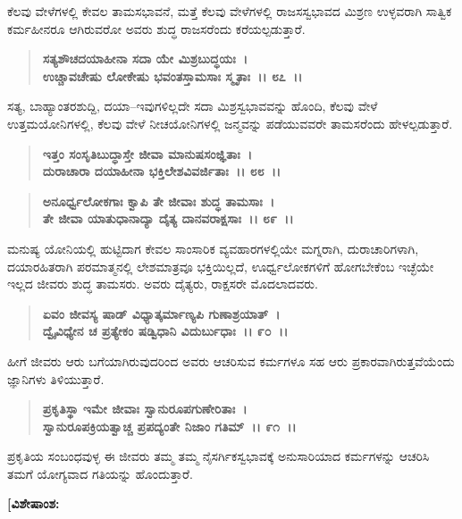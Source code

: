 ಕೆಲವು ವೇಳೆಗಳಲ್ಲಿ ಕೇವಲ ತಾಮಸಭಾವನೆ, ಮತ್ತೆ ಕೆಲವು ವೇಳೆಗಳಲ್ಲಿ ರಾಜಸಸ್ವಭಾವದ ಮಿಶ್ರಣ ಉಳ್ಳವರಾಗಿ ಸಾತ್ವಿಕ ಕರ್ಮಹೀನರೂ ಆಗಿರುವರೋ ಅವರು ಶುದ್ಧ ರಾಜಸರೆಂದು ಕರೆಯಲ್ಪಡುತ್ತಾರೆ.

\begin{verse}
\textbf{ಸತ್ಯಶೌಚದಯಾಹೀನಾ ಸದಾ ಯೇ ಮಿಶ್ರಬುದ್ಧಯಃ~।}\\\textbf{ಉಚ್ಚಾವಚೇಷು ಲೋಕೇಷು ಭವಂತಸ್ತಾಮಸಾಃ ಸ್ಮೃತಾಃ~।। ೮೭~।।}
\end{verse}

ಸತ್ಯ, ಬಾಹ್ಯಾಂತರಶುದ್ದಿ, ದಯಾ–ಇವುಗಳಿಲ್ಲದೇ ಸದಾ ಮಿಶ್ರಸ್ವಭಾವವನ್ನು ಹೊಂದಿ, ಕೆಲವು ವೇಳೆ ಉತ್ತಮಯೋನಿಗಳಲ್ಲಿ, ಕೆಲವು ವೇಳೆ ನೀಚಯೋನಿಗಳಲ್ಲಿ ಜನ್ಮವನ್ನು ಪಡೆಯುವವರೇ ತಾಮಸರೆಂದು ಹೇಳಲ್ಪಡುತ್ತಾರೆ.

\begin{verse}
\textbf{ಇತ್ತಂ ಸಂಸೃತಿಬುದ್ಧಾಸ್ತೇ ಜೀವಾ ಮಾನುಷಸಂಜ್ಞಿತಾಃ~।}\\\textbf{ದುರಾಚಾರಾ ದಯಾಹೀನಾ ಭಕ್ತಿಲೇಶವಿವರ್ಜಿತಾಃ~।। ೮೮~।।} 
\end{verse}

\begin{verse}
\textbf{ಅನೂರ್ಧ್ವಲೋಕಗಾಃ ಕ್ವಾಪಿ ತೇ ಜೀವಾಃ ಶುದ್ಧ ತಾಮಸಾಃ~।}\\\textbf{ತೇ ಜೀವಾ ಯಾತುಧಾನಾದ್ಯಾ ದೈತ್ಯ ದಾನವರಾಕ್ಷಸಾಃ~।। ೮೯~।।}
\end{verse}

ಮನುಷ್ಯ ಯೋನಿಯಲ್ಲಿ ಹುಟ್ಟಿದಾಗ ಕೇವಲ ಸಾಂಸಾರಿಕ ವ್ಯವಹಾರಗಳಲ್ಲಿಯೇ ಮಗ್ನರಾಗಿ, ದುರಾಚಾರಿಗಳಾಗಿ, ದಯಾರಹಿತರಾಗಿ ಪರಮಾತ್ಮನಲ್ಲಿ ಲೇಶಮಾತ್ರವೂ ಭಕ್ತಿಯಿಲ್ಲದೆ, ಊರ್ಧ್ವಲೋಕಗಳಿಗೆ ಹೋಗಬೇಕೆಂಬ ಇಚ್ಛೆಯೇ ಇಲ್ಲದ ಜೀವರು ಶುದ್ಧ ತಾಮಸರು. ಅವರು ದೈತ್ಯರು, ರಾಕ್ಷಸರೇ ಮೊದಲಾದವರು.

\begin{verse}
\textbf{ಏವಂ ಜೀವಸ್ಯ ಷಾಡ್ ವಿಧ್ಯಾತ್ಕರ್ಮಾಣ್ಯಪಿ ಗುಣಾಶ್ರಯಾತ್~।}\\\textbf{ದ್ವೈವಿಧ್ಯೇನ ಚ ಪ್ರತ್ಯೇಕಂ ಷಡ್ವಿಧಾನಿ ವಿದುರ್ಬುಧಾಃ~।। ೯೦~।।}
\end{verse}

ಹೀಗೆ ಜೀವರು ಆರು ಬಗೆಯಾಗಿರುವುದರಿಂದ ಅವರು ಆಚರಿಸುವ ಕರ್ಮಗಳೂ ಸಹ ಆರು ಪ್ರಕಾರವಾಗಿರುತ್ತವೆಯೆಂದು ಜ್ಞಾನಿಗಳು ತಿಳಿಯುತ್ತಾರೆ.

\begin{verse}
\textbf{ಪ್ರಕೃತಿಸ್ಥಾ ಇಮೇ ಜೀವಾಃ ಸ್ವಾನುರೂಪಗುಣೇರಿತಾಃ~।}\\\textbf{ಸ್ವಾನುರೂಪಕ್ರಿಯತ್ವಾಚ್ಚ ಪ್ರಪದ್ಯಂತೇ ನಿಜಾಂ ಗತಿಮ್~।। ೯೧~।।}
\end{verse}

ಪ್ರಕೃತಿಯ ಸಂಬಂಧವುಳ್ಳ ಈ ಜೀವರು ತಮ್ಮ ತಮ್ಮ ನೈಸರ್ಗಿಕಸ್ವಭಾವಕ್ಕೆ ಅನುಸಾರಿಯಾದ ಕರ್ಮಗಳನ್ನು ಆಚರಿಸಿ ತಮಗೆ ಯೋಗ್ಯವಾದ ಗತಿಯನ್ನು ಹೊಂದುತ್ತಾರೆ.

\begin{flushleft}
\textbf{[ವಿಶೇಷಾಂಶ:} 
\end{flushleft}

